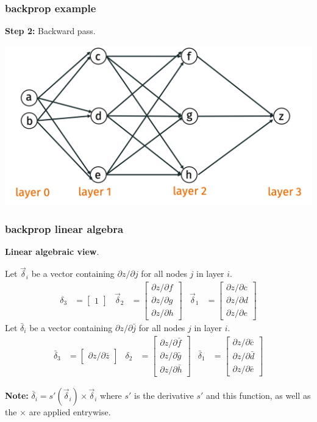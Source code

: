 \documentclass[handout,compress]{beamer}
\begin{document}
\begin{frame}[t]
	\frametitle{backprop example}
	\textbf{Step 2:} Backward pass.  
	
	\includegraphics[width=.5\textwidth]{backpro_example.png}
\end{frame}

\begin{frame}
	\frametitle{backprop linear algebra}
	\small
	\textbf{Linear algebraic view}. 
	
	Let $\vec{\delta}_i$ be a vector containing $\partial z /\partial j$ for all nodes $j$ in layer $i$. 
	\begin{align*}
	\delta_3 &= \begin{bmatrix}1\end{bmatrix} & \vec{\delta}_2 &= \begin{bmatrix}\partial z /\partial f\\\partial z /\partial g\\\partial z /\partial h\end{bmatrix} & \vec{\delta}_1 &= \begin{bmatrix}\partial z /\partial c\\\partial z /\partial d\\\partial z /\partial e\end{bmatrix} 
	\end{align*}
	Let $\bar{\delta}_i$ be a vector containing $\partial z /\partial \bar{j}$ for all nodes $j$ in layer $i$. 
	\begin{align*}
	\bar{\delta}_3 &= \begin{bmatrix}\partial z /\partial \bar{z}\end{bmatrix} & \delta_2 &= \begin{bmatrix}\partial z /\partial \bar{f}\\\partial z /\partial \bar{g}\\\partial z /\partial \bar{h}\end{bmatrix} & \bar{\delta}_1 &= \begin{bmatrix}\partial z /\partial \bar{c}\\\partial z /\partial \bar{d}\\ \partial z /\partial \bar{e}\end{bmatrix} 
	\end{align*}
	
	\textbf{Note:} $\bar{\delta}_i = s'(\vec{\delta}_i) \times \vec{\delta}_i$ where $s'$ is the derivative $s'$ and this function, as well as the $\times$ are applied entrywise. 
\end{frame}
\end{document}
